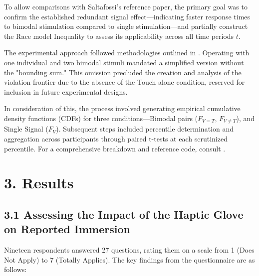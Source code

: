 \documentclass[12pt,oneside,openright]{report}
\begin{document}
To allow comparisons with Saltafossi's reference paper, the primary goal was to confirm the established redundant signal effect—indicating faster response times to bimodal stimulation compared to single stimulation—and partially construct the Race model Inequality to assess its applicability across all time periods $t$.

The experimental approach followed methodologies outlined in \cite{Ulrich2007,Innes2019ACA}. Operating with one individual and two bimodal stimuli mandated a simplified version without the "bounding sum." This omission precluded the creation and analysis of the violation frontier due to the absence of the Touch alone condition, reserved for inclusion in future experimental designs.

In consideration of this, the process involved generating empirical cumulative density functions (CDFs) for three conditions—Bimodal pairs ($F_{V=T}$, $F_{V \neq T}$), and Single Signal ($F_V$). Subsequent steps included percentile determination and aggregation across participants through paired t-tests at each scrutinized percentile. For a comprehensive breakdown and reference code, consult \cite{Ulrich2007}.

\section*{3. Results}
\subsection*{3.1 Assessing the Impact of the Haptic Glove on Reported Immersion}
    
Nineteen respondents answered 27 questions, rating them on a scale from 1 (Does Not Apply) to 7 (Totally Applies). The key findings from the questionnaire are as follows:
    
\end{document}
